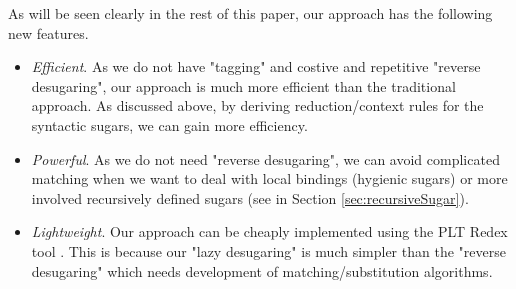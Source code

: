 As will be seen clearly in the rest of this paper, our approach has the following new features.
\begin{itemize}
  \item {\em Efficient}. As we do not have "tagging" and costive and repetitive "reverse desugaring", our approach is much more efficient than the traditional approach. As discussed above, by deriving reduction/context rules for the syntactic sugars, we can gain more efficiency.

  \item {\em Powerful}. As we do not need "reverse desugaring", we can avoid complicated matching when we want to deal with local bindings (hygienic sugars) or more involved recursively defined sugars (see  in Section \ref{sec:recursiveSugar}).

  \item {\em Lightweight}. Our approach can be cheaply implemented using the PLT Redex tool \cite{SEwPR}. This is because our "lazy desugaring" is much simpler than the "reverse desugaring" which needs development of matching/substitution algorithms.

\end{itemize}
